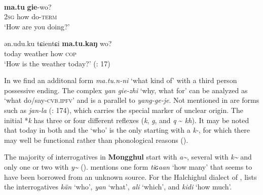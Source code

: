 \newpage
\ea%
    \label{ex:mong:61}
    \\
    \ea
     \textbf{{ma.tu}} \textbf{{gie}}{-wo?}\\
    2\textsc{sg}  how  do-\textsc{term}\\
    \glt ‘How are you doing?’
    
    \ex
    \gll ən.udu.ku  tɕientɕi \textbf{{ma.tu.kaŋ}} wo?\\
    today    weather  how    \textsc{cop}\\
    \glt ‘How is the weather today?’ (\citealt{Chaolu1994b}: 17)
    \z
    \z

\noindent In \citet[288]{Todaeva1959} we find an additonal form \textit{ma.tu.n-ni} ‘what kind of’ with a third person possessive ending. The complex  \textit{yan gie-zhi} ‘why, what for’ can be analyzed as ‘what do/say-\textsc{cvb}.\textsc{ipfv}’ and is a parallel to  \textit{yang-}\textit{ge-je}. Not mentioned in  are  forms such as \textit{jan-la} (\citealt{MaGuoliang1986}: 174), which carries the special   marker of unclear origin. The initial *\textit{k} has three or four different reflexes (\textit{k}, \textit{g}, and \textit{q} {\textasciitilde} \textit{kh}). It may be noted that today in both  and  the  ‘who’ is the only  starting with a \textit{k-}, for which there may well be functional rather than phonological reasons ().

The majority of interrogatives in \textbf{Mongghul} start with \textit{a{\textasciitilde}}, several with \textit{k{\textasciitilde}} and only one or two with \textit{y{\textasciitilde}} (). \citet[127]{Faehndrich2007} mentions one form \textit{tiɢaan} ‘how many’ that seems to have been borrowed from an unknown source. For the Halchighul dialect of , \cite[151]{Schröder1964} lists the interrogatives \textit{kän} ‘who’, \textit{yan} ‘what’, \textit{ali} ‘which’, and \textit{kidi} ‘how much’.

